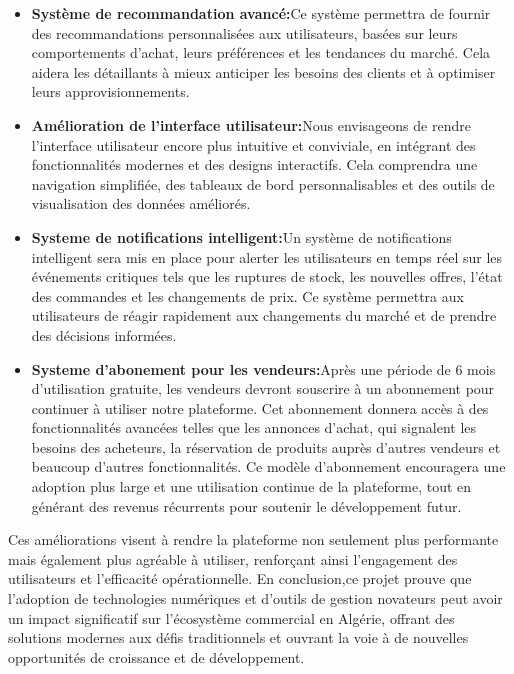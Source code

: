 \documentclass[edit,12pt,a4paper,ChapStyle,oneside,doubleinterligne]{report}
\begin{document}
\begin{itemize}
    \item \textbf{Système de recommandation avancé:}Ce système permettra de fournir des recommandations personnalisées aux utilisateurs, basées sur leurs comportements d'achat, leurs préférences et les tendances du marché. Cela aidera les détaillants à mieux anticiper les besoins des clients et à optimiser leurs approvisionnements.
    \item \textbf{Amélioration de l'interface utilisateur:}Nous envisageons de rendre l'interface utilisateur encore plus intuitive et conviviale, en intégrant des fonctionnalités modernes et des designs interactifs. Cela comprendra une navigation simplifiée, des tableaux de bord personnalisables et des outils de visualisation des données améliorés.
    \item \textbf{Systeme de notifications intelligent:}Un système de notifications intelligent sera mis en place pour alerter les utilisateurs en temps réel sur les événements critiques tels que les ruptures de stock, les nouvelles offres, l’état des commandes et les changements de prix. Ce système permettra aux utilisateurs de réagir rapidement aux changements du marché et de prendre des décisions informées.
    \item \textbf{Systeme d’abonement pour les vendeurs:}Après une période de 6 mois d'utilisation gratuite, les vendeurs devront souscrire à un abonnement pour continuer à utiliser notre plateforme. Cet abonnement donnera accès à des fonctionnalités avancées telles que les annonces d'achat, qui signalent les besoins des acheteurs, la réservation de produits auprès d'autres vendeurs et beaucoup d'autres fonctionnalités. Ce modèle d’abonnement encouragera une adoption plus large et une utilisation continue de la plateforme, tout en générant des revenus récurrents pour soutenir le développement futur.
\end{itemize}

Ces améliorations visent à rendre la plateforme non seulement plus performante mais également plus agréable à utiliser, renforçant ainsi l'engagement des utilisateurs et l'efficacité opérationnelle.
\newline \newline 
En conclusion,ce projet prouve que l'adoption de technologies numériques et d'outils de gestion novateurs peut avoir un impact significatif sur l'écosystème commercial en Algérie, offrant des solutions modernes aux défis traditionnels et ouvrant la voie à de nouvelles opportunités de croissance et de développement.
\end{document}
